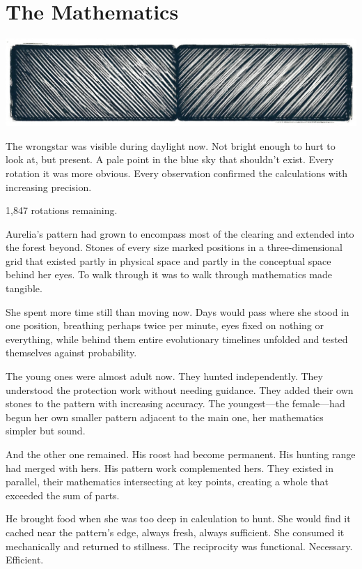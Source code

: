 \chapter{The Mathematics}
\label{ch:07}



\begin{center}
\includegraphics[width=\textwidth]{images/chapterImages/genesis_sketch_00074_.png}
\end{center}

The wrongstar was visible during daylight now. Not bright enough to hurt to look at, but present. A pale point in the blue sky that shouldn't exist. Every rotation it was more obvious. Every observation confirmed the calculations with increasing precision.

1,847 rotations remaining.

Aurelia's pattern had grown to encompass most of the clearing and extended into the forest beyond. Stones of every size marked positions in a three-dimensional grid that existed partly in physical space and partly in the conceptual space behind her eyes. To walk through it was to walk through mathematics made tangible.

She spent more time still than moving now. Days would pass where she stood in one position, breathing perhaps twice per minute, eyes fixed on nothing or everything, while behind them entire evolutionary timelines unfolded and tested themselves against probability.

The young ones were almost adult now. They hunted independently. They understood the protection work without needing guidance. They added their own stones to the pattern with increasing accuracy. The youngest—the female—had begun her own smaller pattern adjacent to the main one, her mathematics simpler but sound.

And the other one remained. His roost had become permanent. His hunting range had merged with hers. His pattern work complemented hers. They existed in parallel, their mathematics intersecting at key points, creating a whole that exceeded the sum of parts.

He brought food when she was too deep in calculation to hunt. She would find it cached near the pattern's edge, always fresh, always sufficient. She consumed it mechanically and returned to stillness. The reciprocity was functional. Necessary. Efficient.

